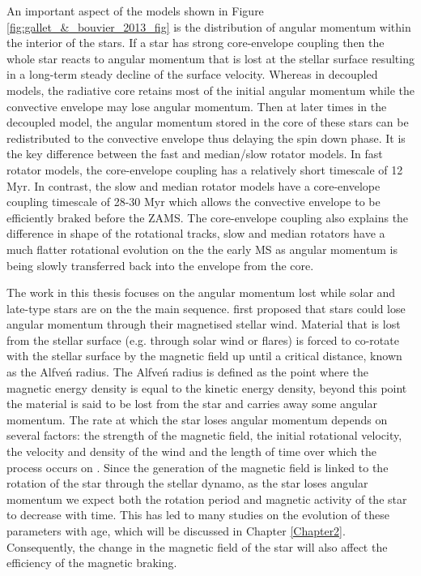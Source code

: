 An important aspect of the models shown in Figure \ref{fig:gallet_&_bouvier_2013_fig} is the distribution of angular momentum within the interior of the stars. If a star has strong core-envelope coupling then the whole star reacts to angular momentum that is lost at the stellar surface resulting in a long-term steady decline of the surface velocity. Whereas in decoupled models, the radiative core retains most of the initial angular momentum while the convective envelope may lose angular momentum. Then at later times in the decoupled model, the angular momentum stored in the core of these stars can be redistributed to the convective envelope thus delaying the spin down phase. It is the key difference between the fast and median/slow rotator models. In fast rotator models, the core-envelope coupling has a relatively short timescale of 12 Myr. In contrast, the slow and median rotator models have a core-envelope coupling timescale of 28-30 Myr which allows the convective envelope to be efficiently braked before the ZAMS. The core-envelope coupling also explains the difference in shape of the rotational tracks, slow and median rotators have a much flatter rotational evolution on the the early MS as angular momentum is being slowly transferred back into the envelope from the core.

The work in this thesis focuses on the angular momentum lost while solar and late-type stars are on the the main sequence. \citet{Schatzman_1962} first proposed that stars could lose angular momentum through their magnetised stellar wind. Material that is lost from the stellar surface (e.g. through solar wind or flares) is forced to co-rotate with the stellar surface by the magnetic field up until a critical distance, known as the Alfve\'n radius. The Alfve\'n radius is defined as the point where the magnetic energy density is equal to the kinetic energy density, beyond this point the material is said to be lost from the star and carries away some angular momentum. The rate at which the star loses angular momentum depends on several factors: the strength of the magnetic field, the initial rotational velocity, the velocity and density of the wind and the length of time over which the process occurs on \citep{Weber_&_Davis_1967}. Since the generation of the magnetic field is linked to the rotation of the star through the stellar dynamo, as the star loses angular momentum we expect both the rotation period and magnetic activity of the star to decrease with time. This has led to many studies on the evolution of these parameters with age, which will be discussed in Chapter \ref{Chapter2}. Consequently, the change in the magnetic field of the star will also affect the efficiency of the magnetic braking.


